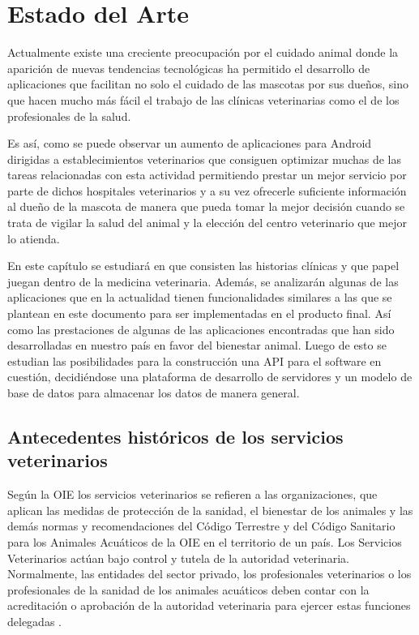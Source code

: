 
\chapter{Estado del Arte}\label{chapter:state-of-the-art}
Actualmente existe una creciente preocupación por el cuidado animal donde la aparición de nuevas tendencias tecnológicas ha permitido el desarrollo de aplicaciones que facilitan no solo el cuidado de las mascotas por sus dueños, sino que hacen mucho más fácil el trabajo de las clínicas veterinarias como el de los profesionales de la salud.

Es así, como se puede observar un aumento de aplicaciones para Android dirigidas a establecimientos veterinarios que consiguen optimizar muchas de las tareas relacionadas con esta actividad permitiendo prestar un mejor servicio por parte de dichos hospitales veterinarios y a su vez ofrecerle suficiente información al dueño de la mascota de manera que pueda tomar la mejor decisión cuando se trata de vigilar la salud del animal y la elección del centro veterinario que mejor lo atienda.

En este capítulo se estudiará en que consisten las historias clínicas y que papel juegan dentro de la medicina veterinaria. Además, se analizarán algunas de las aplicaciones que en la actualidad tienen funcionalidades similares a las que se plantean en este documento para ser implementadas en el producto final. Así como las prestaciones de algunas de las aplicaciones encontradas que han sido desarrolladas en nuestro país en favor del bienestar animal. Luego de esto se estudian las posibilidades para la construcción una API para el software en cuestión, decidiéndose una plataforma de desarrollo de servidores y un modelo de base de datos para almacenar los datos de manera general.\newpage

\section{Antecedentes históricos de los servicios \newline veterinarios}

Según la  OIE  los  servicios veterinarios se refieren a las organizaciones, que aplican las medidas de protección de la sanidad, el bienestar de los animales y las demás normas y recomendaciones del Código Terrestre y del Código Sanitario para los Animales Acuáticos de la OIE en el territorio de un país. Los Servicios Veterinarios actúan bajo control y tutela de la autoridad veterinaria. Normalmente, las entidades del sector privado, los profesionales veterinarios o los profesionales de la sanidad de los animales acuáticos deben contar con la acreditación o aprobación de la autoridad veterinaria para ejercer estas funciones delegadas . 


